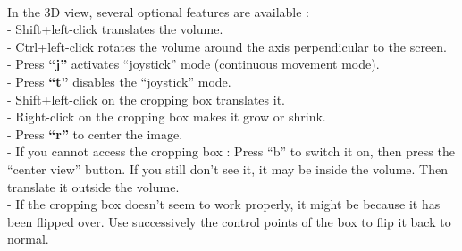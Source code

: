 \ \\

\noindent In the 3D view, several optional features are available :\\
- Shift+left-click translates the volume.\\
- Ctrl+left-click rotates the volume around the axis perpendicular to the screen.\\
- Press {\large \bf ``j''} activates ``joystick'' mode (continuous movement mode).\\
- Press {\large \bf ``t''} disables the ``joystick'' mode.\\
- Shift+left-click on the cropping box translates it.\\
- Right-click on the cropping box makes it grow or shrink.\\
- Press {\large \bf ``r''} to center the image.\\
- If you cannot access the cropping box : Press ``b'' to switch it on,
then press the ``center view'' button. If you still don't see it, it may be inside the
volume. Then translate it outside the volume.\\
- If the cropping box doesn't seem to work properly, it might be because it has been flipped over. Use
successively the control points of the box to flip it back to normal. 
